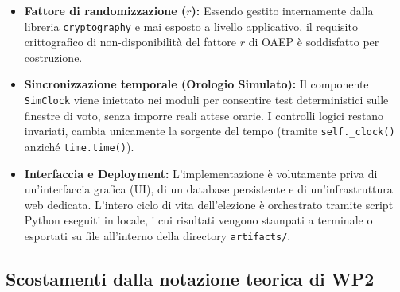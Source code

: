 \begin{itemize}
  \item \textbf{Fattore di randomizzazione ($r$):} Essendo gestito internamente dalla libreria \texttt{cryptography} e mai esposto a livello applicativo, il requisito crittografico di non-disponibilità del fattore $r$ di OAEP è soddisfatto per costruzione.

  \item \textbf{Sincronizzazione temporale (Orologio Simulato):} Il componente \texttt{SimClock} viene iniettato nei moduli per consentire test deterministici sulle finestre di voto, senza imporre reali attese orarie. I controlli logici restano invariati, cambia unicamente la sorgente del tempo (tramite \texttt{self.\_clock()} anziché \texttt{time.time()}).
  
  \item \textbf{Interfaccia e Deployment:} L'implementazione è volutamente priva di un'interfaccia grafica (UI), di un database persistente e di un'infrastruttura web dedicata. L'intero ciclo di vita dell'elezione è orchestrato tramite script Python eseguiti in locale, i cui risultati vengono stampati a terminale o esportati su file all'interno della directory \texttt{artifacts/}.
\end{itemize}

\subsection{Scostamenti dalla notazione teorica di WP2}
\label{subsec:wp4_scostamenti}

